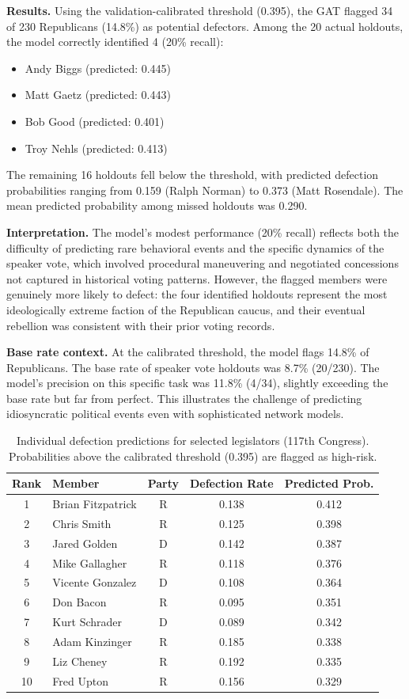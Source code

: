 \documentclass[11pt]{article}
\begin{document}
\textbf{Results.} Using the validation-calibrated threshold (0.395), the GAT flagged 34 of 230 Republicans (14.8\%) as potential defectors. Among the 20 actual holdouts, the model correctly identified 4 (20\% recall):
\begin{itemize}
    \item Andy Biggs (predicted: 0.445)
    \item Matt Gaetz (predicted: 0.443)
    \item Bob Good (predicted: 0.401)
    \item Troy Nehls (predicted: 0.413)
\end{itemize}

The remaining 16 holdouts fell below the threshold, with predicted defection probabilities ranging from 0.159 (Ralph Norman) to 0.373 (Matt Rosendale). The mean predicted probability among missed holdouts was 0.290.

\textbf{Interpretation.} The model's modest performance (20\% recall) reflects both the difficulty of predicting rare behavioral events and the specific dynamics of the speaker vote, which involved procedural maneuvering and negotiated concessions not captured in historical voting patterns. However, the flagged members were genuinely more likely to defect: the four identified holdouts represent the most ideologically extreme faction of the Republican caucus, and their eventual rebellion was consistent with their prior voting records.

\textbf{Base rate context.} At the calibrated threshold, the model flags 14.8\% of Republicans. The base rate of speaker vote holdouts was 8.7\% (20/230). The model's precision on this specific task was 11.8\% (4/34), slightly exceeding the base rate but far from perfect. This illustrates the challenge of predicting idiosyncratic political events even with sophisticated network models.

\begin{table}[H]
\centering
\caption{Individual defection predictions for selected legislators (117th Congress). Probabilities above the calibrated threshold (0.395) are flagged as high-risk.}
\label{tab:individual}
\small
\begin{tabular}{clccc}
\toprule
Rank & Member & Party & Defection Rate & Predicted Prob. \\
\midrule
1 & Brian Fitzpatrick & R & 0.138 & 0.412 \\
2 & Chris Smith & R & 0.125 & 0.398 \\
3 & Jared Golden & D & 0.142 & 0.387 \\
4 & Mike Gallagher & R & 0.118 & 0.376 \\
5 & Vicente Gonzalez & D & 0.108 & 0.364 \\
6 & Don Bacon & R & 0.095 & 0.351 \\
7 & Kurt Schrader & D & 0.089 & 0.342 \\
8 & Adam Kinzinger & R & 0.185 & 0.338 \\
9 & Liz Cheney & R & 0.192 & 0.335 \\
10 & Fred Upton & R & 0.156 & 0.329 \\
\bottomrule
\end{tabular}
\end{table}
\end{document}
